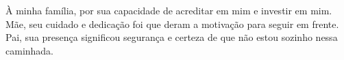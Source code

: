 À minha família, por sua capacidade de acreditar em mim e investir em mim. Mãe, seu cuidado e dedicação foi que deram a motivação para seguir em frente. Pai, sua presença significou segurança e certeza de que não estou sozinho nessa caminhada.